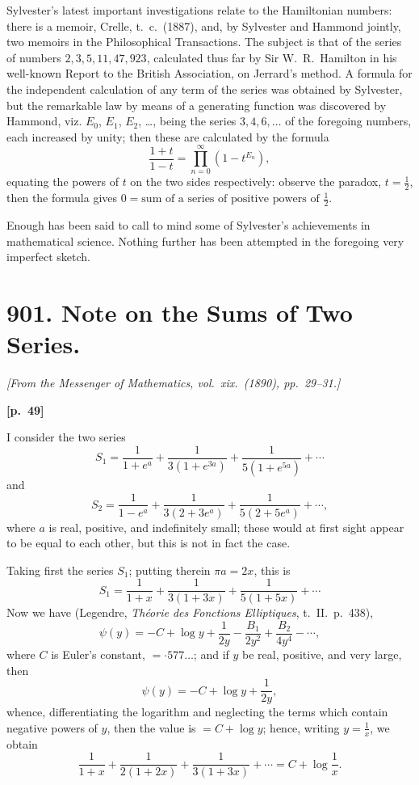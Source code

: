 \documentclass[11pt,a4paper]{article}
\theoremstyle{plain}
\begin{document}
Sylvester's latest important investigations relate to the Hamiltonian numbers: there is a memoir, Crelle, t.\ c.\ (1887), and, by Sylvester and Hammond jointly, two memoirs in the Philosophical Transactions. The subject is that of the series of numbers $2, 3, 5, 11, 47, 923$, calculated thus far by Sir W.\ R.\ Hamilton in his well-known Report to the British Association, on Jerrard's method. A formula for the independent calculation of any term of the series was obtained by Sylvester, but the remarkable law by means of a generating function was discovered by Hammond, viz. $E_0$, $E_1$, $E_2$, \ldots, being the series $3, 4, 6, \ldots$ of the foregoing numbers, each increased by unity; then these are calculated by the formula
$$
\frac{1 + t}{1 - t} = \prod_{n=0}^{\infty} (1 - t^{E_n}),
$$
equating the powers of $t$ on the two sides respectively: observe the paradox, $t = \frac{1}{2}$, then the formula gives $0 = \text{sum of a series of positive powers of } \frac{1}{2}$.

Enough has been said to call to mind some of Sylvester's achievements in mathematical science. Nothing further has been attempted in the foregoing very imperfect sketch.

\newpage

\section*{901. Note on the Sums of Two Series.}

\noindent\textit{[From the Messenger of Mathematics, vol.\ xix.\ (1890), pp.\ 29--31.]}

\vspace{0.5em}
\noindent\textbf{[p.\ 49]}

I consider the two series
$$
S_1 = \frac{1}{1 + e^a} + \frac{1}{3(1 + e^{3a})} + \frac{1}{5(1 + e^{5a})} + \cdots
$$
and
$$
S_2 = \frac{1}{1 - e^a} + \frac{1}{3(2 + 3e^a)} + \frac{1}{5(2 + 5e^a)} + \cdots,
$$
where $a$ is real, positive, and indefinitely small; these would at first sight appear to be equal to each other, but this is not in fact the case.

Taking first the series $S_1$; putting therein $\pi a = 2x$, this is
$$
S_1 = \frac{1}{1 + x} + \frac{1}{3(1 + 3x)} + \frac{1}{5(1 + 5x)} + \cdots
$$
Now we have (Legendre, \textit{Th\'eorie des Fonctions Elliptiques}, t.\ II.\ p.\ 438),
$$
\psi(y) = -C + \log y + \frac{1}{2y} - \frac{B_1}{2y^2} + \frac{B_2}{4y^4} - \cdots,
$$
where $C$ is Euler's constant, $= \cdot 577\ldots$; and if $y$ be real, positive, and very large, then
$$
\psi(y) = -C + \log y + \frac{1}{2y},
$$
whence, differentiating the logarithm and neglecting the terms which contain negative powers of $y$, then the value is $= C + \log y$; hence, writing $y = \frac{1}{x}$, we obtain
$$
\frac{1}{1 + x} + \frac{1}{2(1 + 2x)} + \frac{1}{3(1 + 3x)} + \cdots = C + \log\frac{1}{x}.
$$
\end{document}
